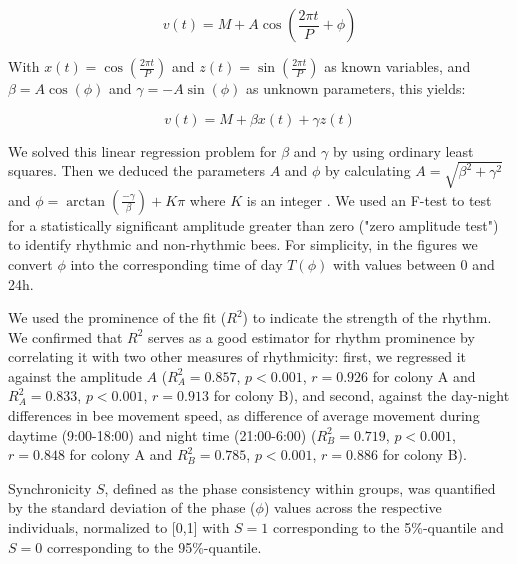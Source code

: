 \documentclass{article}
\begin{document}
\begin{equation}
v(t) = M + A \cos\left(\frac{2 \pi t}{P} + \phi\right)
\end{equation}

With $x(t) = \cos\left(\frac{2\pi t}{P}\right)$ and $z(t) = \sin\left(\frac{2\pi t}{P}\right)$ as known variables, and $\beta = A \cos(\phi)$ and $\gamma = -A \sin(\phi)$ as unknown parameters, this yields:

\begin{equation}
v(t) = M + \beta x(t) + \gamma z(t)
\end{equation}

We solved this linear regression problem for $\beta$ and $\gamma$ by using ordinary least squares. Then we deduced the parameters $A$ and $\phi$ by calculating $A = \sqrt{\beta^2 + \gamma^2}$ and $\phi = \arctan\left(\frac{-\gamma}{\beta}\right) + K\pi$ where $K$ is an integer \cite{cornelissen_cosinor-based_2014}. We used an F-test \cite{cornelissen_cosinor-based_2014} to test for a statistically significant amplitude greater than zero ("zero amplitude test") to identify rhythmic and non-rhythmic bees. For simplicity, in the figures we convert $\phi$ into the corresponding time of day $T(\phi)$ with values between 0 and 24h.

We used the prominence of the fit ($R^2$) to indicate the strength of the rhythm. We confirmed that $R^2$ serves as a good estimator for rhythm prominence by correlating it with two other measures of rhythmicity: first, we regressed it against the amplitude $A$ ($R_{A}^2 = 0.857$, $p < 0.001$, $r = 0.926$ for colony A and $R_{A}^2 = 0.833$, $p < 0.001$, $r = 0.913$ for colony B), and second, against the day-night differences in bee movement speed, as difference of average movement during daytime (9:00-18:00) and night time (21:00-6:00) ($R_{B}^2 = 0.719$, $p < 0.001$, $r = 0.848$ for colony A and $R_{B}^2 = 0.785$, $p < 0.001$, $r = 0.886$ for colony B).

Synchronicity $S$, defined as the phase consistency within groups, was quantified by the standard deviation of the phase ($\phi$) values across the respective individuals, normalized to [0,1] with $S=1$ corresponding to the 5\%-quantile and $S=0$ corresponding to the 95\%-quantile.
\end{document}
